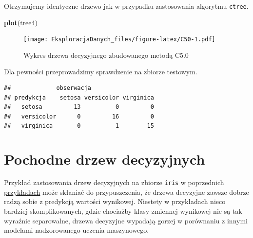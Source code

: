 \documentclass[]{book}
\newenvironment{Shaded}{\begin{snugshade}}{\end{snugshade}}
\newcommand{\DataTypeTok}[1]{\textcolor[rgb]{0.13,0.29,0.53}{#1}}
\newcommand{\KeywordTok}[1]{\textcolor[rgb]{0.13,0.29,0.53}{\textbf{#1}}}
\newcommand{\NormalTok}[1]{#1}
\newcommand{\OperatorTok}[1]{\textcolor[rgb]{0.81,0.36,0.00}{\textbf{#1}}}
\newcommand{\StringTok}[1]{\textcolor[rgb]{0.31,0.60,0.02}{#1}}
\theoremstyle{plain}
\theoremstyle{definition}
\theoremstyle{definition}
\theoremstyle{definition}
\theoremstyle{definition}
\theoremstyle{remark}
\begin{document}
Otrzymujemy identyczne drzewo jak w przypadku zastosowania algorytmu \texttt{ctree}.

\begin{Shaded}
\begin{Highlighting}[]
\KeywordTok{plot}\NormalTok{(tree4)}
\end{Highlighting}
\end{Shaded}

\begin{figure}
\centering
\texttt{[image: EksploracjaDanych\_files/figure-latex/C50-1.pdf]}
\caption{\label{fig:C50}Wykres drzewa decyzyjnego zbudowanego metodą C5.0}
\end{figure}

Dla pewności przeprowadzimy sprawdzenie na zbiorze testowym.

\begin{Shaded}
\end{Shaded}

\begin{verbatim}
##             obserwacja
## predykcja    setosa versicolor virginica
##   setosa         13          0         0
##   versicolor      0         16         0
##   virginica       0          1        15
\end{verbatim}

\hypertarget{pochodne-drzew-decyzyjnych}{%
\chapter{Pochodne drzew decyzyjnych}\label{pochodne-drzew-decyzyjnych}}

Przykład zastosowania drzew decyzyjnych na zbiorze \texttt{iris} w poprzednich \protect\hyperlink{przyk41}{przykładach} może skłaniać do przypuszczenia, że drzewa decyzyjne zawsze dobrze radzą sobie z predykcją wartości wynikowej. Niestety w przykładach nieco bardziej skomplikowanych, gdzie chociażby klasy zmiennej wynikowej nie są tak wyraźnie separowalne, drzewa decyzyjne wypadają gorzej w porównaniu z innymi modelami nadzorowanego uczenia maszynowego.
\end{document}
